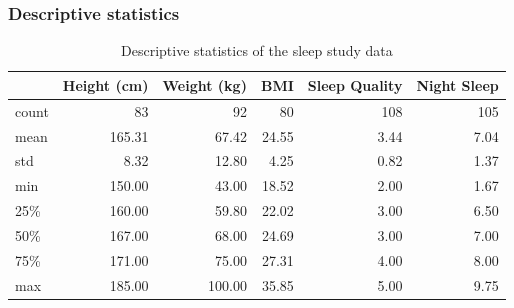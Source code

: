 \documentclass[conference]{IEEEtran}
\begin{document}
\subsubsection*{Descriptive statistics}
\begin{table}[htbp]
    \centering
    \caption{Descriptive statistics of the sleep study data}
    \label{tab:sleep_data1}
    \begin{tabular}{lrrrrr}
        \hline
              & Height (cm) & Weight (kg) & BMI   & Sleep Quality & Night Sleep\footnotemark \\ \hline
        count & 83          & 92          & 80    & 108           & 105                      \\
        mean  & 165.31      & 67.42       & 24.55 & 3.44          & 7.04                     \\
        std   & 8.32        & 12.80       & 4.25  & 0.82          & 1.37                     \\
        min   & 150.00      & 43.00       & 18.52 & 2.00          & 1.67                     \\ \hline
        25\%  & 160.00      & 59.80       & 22.02 & 3.00          & 6.50                     \\
        50\%  & 167.00      & 68.00       & 24.69 & 3.00          & 7.00                     \\
        75\%  & 171.00      & 75.00       & 27.31 & 4.00          & 8.00                     \\
        max   & 185.00      & 100.00      & 35.85 & 5.00          & 9.75                     \\
        \hline
    \end{tabular}
\end{table}
\end{document}
